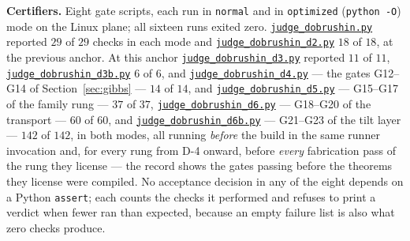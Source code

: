 \documentclass[11pt]{article}
\theoremstyle{definition}
\newcommand{\anchor}{c7b870b05bd6d1bec270d499e1358a64070ce0e1}
\newcommand{\repofile}[2]{%
  \href{https://github.com/lluiseriksson/THE-ERIKSSON-PROGRAMME/blob/\anchor/#1}{\nolinkurl{#2}}}
\begin{document}
\textbf{Certifiers.}  Eight gate scripts, each run in \texttt{normal} and in
\texttt{optimized} (\texttt{python -O}) mode on the Linux plane; all sixteen
runs exited zero.  \repofile{scripts/judge\_dobrushin.py}{judge\_dobrushin.py}
reported $29$ of $29$ checks in each mode and
\repofile{scripts/judge\_dobrushin\_d2.py}{judge\_dobrushin\_d2.py} $18$ of
$18$, at the previous anchor.  At this anchor
\repofile{scripts/judge\_dobrushin\_d3.py}{judge\_dobrushin\_d3.py} reported
$11$ of $11$,
\repofile{scripts/judge\_dobrushin\_d3b.py}{judge\_dobrushin\_d3b.py} $6$ of
$6$, and \repofile{scripts/judge\_dobrushin\_d4.py}{judge\_dobrushin\_d4.py}
--- the gates G12--G14 of Section~\ref{sec:gibbs} --- $14$ of $14$, and
\repofile{scripts/judge\_dobrushin\_d5.py}{judge\_dobrushin\_d5.py} --- G15--G17
of the family rung --- $37$ of $37$,
\repofile{scripts/judge\_dobrushin\_d6.py}{judge\_dobrushin\_d6.py} ---
G18--G20 of the transport --- $60$ of $60$, and
\repofile{scripts/judge\_dobrushin\_d6b.py}{judge\_dobrushin\_d6b.py} ---
G21--G23 of the tilt layer --- $142$ of $142$, in both
modes, all running \emph{before} the build in the same runner
invocation and, for every rung from D-4 onward, before \emph{every}
fabrication pass of the rung
they license --- the record shows the gates passing before the theorems they
license were compiled.  No acceptance decision in any of the eight depends on a
Python \texttt{assert}; each counts the checks it performed and refuses to
print a verdict when fewer ran than expected, because an empty failure list is
also what zero checks produce.
\end{document}
